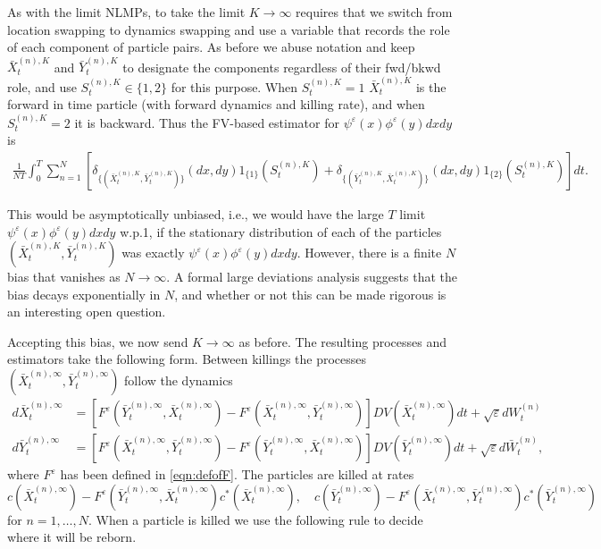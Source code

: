 \documentclass[english,11pt]{article}%
\numberwithin{equation}{section}
\numberwithin{example}{section}
\numberwithin{theorem}{section}
\begin{document}
As with the limit NLMPs, to take the limit $K\rightarrow\infty$ requires that
we switch from location swapping to dynamics swapping and use a variable that
records the role of each component of particle pairs. As before we abuse
notation and keep $\bar{X}_{t}^{(n),K}$ and $\bar{Y}_{t}^{(n),K}$ to designate
the components regardless of their fwd/bkwd role, and use $S_{t}^{(n),K}%
\in\{1,2\}$ for this purpose. When $S_{t}^{(n),K}=1$ $\bar{X}_{t}^{(n),K}$ is
the forward in time particle (with forward dynamics and killing rate), and
when $S_{t}^{(n),K}=2$ it is backward. Thus the FV-based estimator for
$\psi^{\varepsilon}(x)\phi^{\varepsilon}(y)dxdy$ is
\begin{align} \label{eq: empirical_distribution}
\frac{1}{NT}\int_{0}^{T}\sum_{n=1}^{N}\left[  \delta_{\{(\bar{X}_{t}%
^{(n),K},\bar{Y}_{t}^{(n),K})\}}(dx,dy)1_{\{1\}}(S_{t}^{(n),K})+\delta
_{\{(\bar{Y}_{t}^{(n),K},\bar{X}_{t}^{(n),K})\}}(dx,dy)1_{\{2\}}(S_{t}%
^{(n),K})\right]  dt.
\end{align}


This would be asymptotically unbiased, i.e., we would have the large $T$ limit
$\psi^{\varepsilon}(x)\phi^{\varepsilon}(y)dxdy$ w.p.1, if the stationary
distribution of each of the particles $(\bar{X}_{t}^{(n),K},\bar{Y}%
_{t}^{(n),K})$ was exactly $\psi^{\varepsilon}(x)\phi^{\varepsilon}(y)dxdy$.
However, there is a finite $N$ bias that vanishes as $N\rightarrow\infty$.
A formal large deviations analysis suggests that the bias decays exponentially in $N$,
and whether or not this can be made rigorous is an interesting open question.
 

Accepting this bias, we now send $K\rightarrow\infty$ as before. The resulting
processes and estimators take the following form. Between killings the
processes $(\bar{X}_{t}^{(n),\infty},\bar{Y}_{t}^{(n),\infty})$ follow the
dynamics
\begin{align*}
d\bar{X}_{t}^{(n),\infty}  &  =\left[  F^{\varepsilon}(\bar{Y}_{t}%
^{(n),\infty},\bar{X}_{t}^{(n),\infty})-F^{\varepsilon}(\bar{X}_{t}%
^{(n),\infty},\bar{Y}_{t}^{(n),\infty})\right]  DV(\bar{X}_{t}^{(n),\infty
})dt+\sqrt{\varepsilon}dW_{t}^{(n)}\\
d\bar{Y}_{t}^{(n),\infty}  &  =\left[  F^{\varepsilon}(\bar{X}_{t}%
^{(n),\infty},\bar{Y}_{t}^{(n),\infty})-F^{\varepsilon}(\bar{Y}_{t}%
^{(n),\infty},\bar{X}_{t}^{(n),\infty})\right]  DV(\bar{Y}_{t}^{(n),\infty
})dt+\sqrt{\varepsilon}d\bar{W}_{t}^{(n)},
\end{align*}
where $F^{\varepsilon}$ has been defined in \eqref{eqn:defofF}. The particles
are killed at rates
\[
c(\bar{X}_{t}^{(n),\infty})-F^{\varepsilon}(\bar{Y}_{t}^{(n),\infty},\bar
{X}_{t}^{(n),\infty})c^*(\bar{X}_{t}^{(n),\infty}),\quad c(\bar{Y}%
_{t}^{(n),\infty})-F^{\varepsilon}(\bar{X}_{t}^{(n),\infty},\bar{Y}%
_{t}^{(n),\infty})c^*(\bar{Y}_{t}^{(n),\infty})
\]
for $n=1,\ldots,N$. When a particle is killed we use the following rule to decide where it will be reborn.
\end{document}
